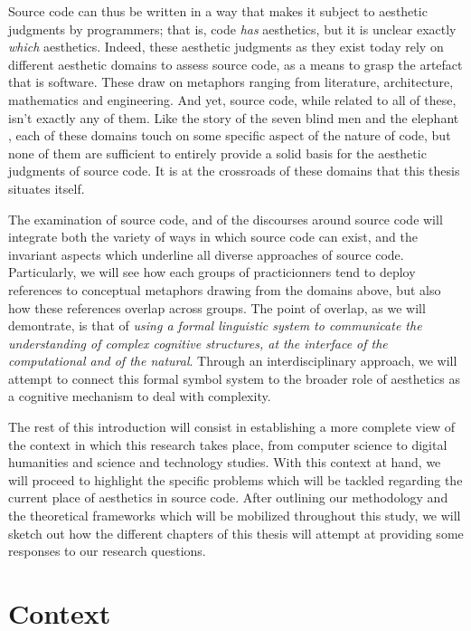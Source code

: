 Source code can thus be written in a way that makes it subject to aesthetic judgments by programmers; that is, code \emph{has} aesthetics, but it is unclear exactly \emph{which} aesthetics. Indeed, these aesthetic judgments as they exist today rely on different aesthetic domains to assess source code, as a means to grasp the artefact that is software. These draw on metaphors ranging from literature, architecture, mathematics and engineering. And yet, source code, while related to all of these, isn't exactly any of them. Like the story of the seven blind men and the elephant \citep{chun_sourcery_2008}, each of these domains touch on some specific aspect of the nature of code, but none of them are sufficient to entirely provide a solid basis for the aesthetic judgments of source code. It is at the crossroads of these domains that this thesis situates itself.

The examination of source code, and of the discourses around source code will integrate both the variety of ways in which source code can exist, and the invariant aspects which underline all diverse approaches of source code. Particularly, we will see how each groups of practicionners tend to deploy references to conceptual metaphors drawing from the domains above, but also how these references overlap across groups. The point of overlap, as we will demontrate, is that of \emph{using a formal linguistic system to communicate the understanding of complex cognitive structures, at the interface of the computational and of the natural}. Through an interdisciplinary approach, we will attempt to connect this formal symbol system to the broader role of aesthetics as a cognitive mechanism to deal with complexity.

The rest of this introduction will consist in establishing a more complete view of the context in which this research takes place, from computer science to digital humanities and science and technology studies. With this context at hand, we will proceed to highlight the specific problems which will be tackled regarding the current place of aesthetics in source code. After outlining our methodology and the theoretical frameworks which will be mobilized throughout this study, we will sketch out how the different chapters of this thesis will attempt at providing some responses to our research questions.

\section{Context}
\label{sec:context}

